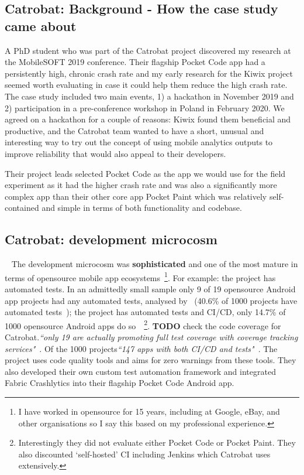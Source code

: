 \subsection{Catrobat: Background - How the case study came about}
A PhD student who was part of the Catrobat project discovered my research at the MobileSOFT 2019 conference. Their flagship Pocket Code app had a persistently high, chronic crash rate and my early research for the Kiwix project seemed worth evaluating in case it could help them reduce the high crash rate. The case study included two main events, 1) a hackathon in November 2019 and 2) participation in a pre-conference workshop in Poland in February 2020. We agreed on a hackathon for a couple of reasons: Kiwix found them beneficial and productive, and the Catrobat team wanted to have a short, unusual and interesting way to try out the concept of using mobile analytics outputs to improve reliability that would also appeal to their developers. 

Their project leads selected Pocket Code as the app we would use for the field experiment as it had the higher crash rate and was also a significantly more complex app than their other core app Pocket Paint which was relatively self-contained and simple in terms of both functionality and codebase.



\subsection{Catrobat: development microcosm}~\label{catrobat-development-microcosm}
The development microcosm was \textbf{sophisticated} and one of the most mature in terms of opensource mobile app ecosystems~\footnote{I have worked in opensource for 15 years, including at Google, eBay, and other organisations so I say this based on my professional experience.}. For example: the project has automated tests. In an admittedly small sample only 9 of 19 opensource Android app projects had any automated tests, analysed by~\citet{silva2016_an_analysis_of_automated_tests_for_mobile_android_apps} (40.6\% of 1000 projects have automated tests~\citep[p. ]{cruz2019_guess_what_test_your_app}); the project has automated tests and CI/CD, only 14.7\% of 1000 opensource Android apps do so~\citep[p. ]{cruz2019_guess_what_test_your_app}~\footnote{Interestingly they did not evaluate either Pocket Code or Pocket Paint. They also discounted `self-hosted' CI including Jenkins which Catrobat uses extensively.}.  \textbf{TODO} check the code coverage for Catrobat.\emph{``only 19 are actually promoting full test coverage with coverage tracking services"}~\citep[p. ]{cruz2019_guess_what_test_your_app}. Of the 1000 projects\emph{``147 apps with both CI/CD and tests"}~\citep[p. ]{cruz2019_guess_what_test_your_app}. The project uses code quality tools and aims for zero warnings from these tools. They also developed their own custom test automation framework and integrated Fabric Crashlytics into their flagship Pocket Code Android app.

